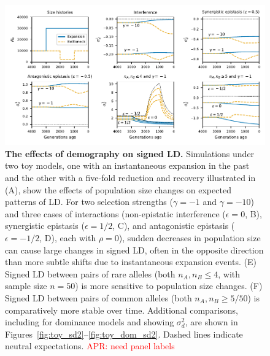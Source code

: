 \documentclass[]{article}
\newcommand{\comment}[1]{{\textcolor{red}{APR: #1}}}
\begin{document}
\begin{figure}[tb!]
    \centering
    \includegraphics{../figures/demog_bottle_expand}
    \caption{
        \textbf{The effects of demography on signed LD.}
        Simulations under two toy models, one with an instantaneous expansion in
        the past and the other with a five-fold reduction and recovery illustrated
        in (A), show the effects of population size changes on expected patterns of LD. 
        For two selection strengths (\(\gamma=-1\) and \(\gamma=-10\)) and three
        cases of interactions (non-epistatic interference (\(\epsilon=0\), B),
        synergistic epistasis (\(\epsilon=1/2\), C), and antagonistic epistasis
        (\(\epsilon=-1/2\), D), each with \(\rho=0\)),
        sudden decreases in population size can cause
        large changes in signed LD, often in the opposite direction than more
        subtle shifts due to instantaneous expansion events.
        (E) Signed LD between pairs of rare alleles (both \(n_A, n_B \leq 4\), with
        sample size \(n=50\)) is more sensitive to population size changes.
        (F) Signed LD between pairs of common alleles (both \(n_A, n_B \geq 5/50\))
        is comparatively more stable over time.
        Additional comparisons, including for dominance models and showing
        \(\sigma_d^2\), are shown in Figures~\ref{fig:toy_sd2}--\ref{fig:toy_dom_sd2}.
        Dashed lines indicate neutral expectations.
        \comment{need panel labels}
    }
    \label{fig:toy}
\end{figure}
\end{document}
